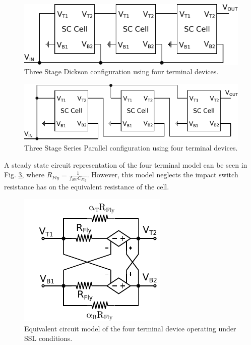 \documentclass[conference]{IEEEtran}
\begin{document}
	\begin{figure}
		\includegraphics[width=\linewidth]{Figures/Dickson.pdf}
		\caption{Three Stage Dickson configuration using four terminal devices.}
		\label{Fig:Dickson_Block}
	\end{figure}

	\begin{figure}
		\includegraphics[width=\linewidth]{Figures/SeriesParallel.pdf}
		\caption{Three Stage Series Parallel configuration using four terminal devices.}
		\label{Fig:SeriesP_Block}
	\end{figure}
	
	A steady state circuit representation of the four terminal model can be seen in Fig. \ref{Fig:CircEQ}, where $R_{Fly} = \frac{1}{f_{SW}C_{Fly}}$. However, this model neglects the impact switch resistance has on the equivalent resistance of the cell.
	
	\begin{figure}
		\centering
		\includegraphics[width=0.6\linewidth]{Figures/CellRes_SSL.pdf}
		\caption{Equivalent circuit model of the four terminal device operating under SSL conditions.}
		\label{Fig:CircEQ}
	\end{figure}
	
\end{document}

